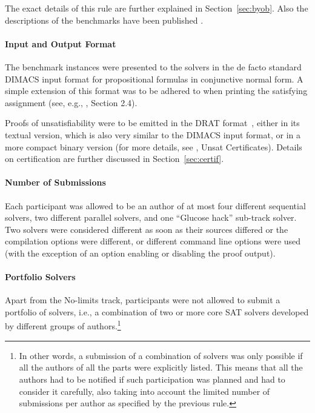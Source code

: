 \documentclass{elsarticle}
\begin{document}
The exact details of this rule are further explained in Section~\ref{sec:byob}.
Also the descriptions of the benchmarks have been published \cite{SC2020}.

\paragraph{Input and Output Format}

The benchmark instances were presented to the solvers in the de facto standard
DIMACS input format for propositional formulas in conjunctive normal form.
A simple extension of this format was to be adhered to when printing 
the satisfying assignment 
(see, e.g., \cite{DBLP:journals/jsat/HeuleJS19}, Section 2.4).

Proofs of unsatisfiability were to be emitted in the DRAT format~\cite{DRATtrim},
either in its textual version, which is also very similar to the DIMACS input format,
or in a more compact binary version (for more details, see \cite{satComp2020www}, Unsat Certificates).
%
Details on certification are further discussed in Section~\ref{sec:certif}.

\paragraph{Number of Submissions}

Each participant was allowed to be an author of at most four different sequential solvers,
two different parallel solvers, and one ``Glucose hack'' sub-track solver.
Two solvers were considered different as soon as their sources differed
or the compilation options were different, or different command line options were used
(with the exception of an option enabling or disabling the proof output).

\paragraph{Portfolio Solvers}

Apart from the No-limits track, participants were not allowed to submit a portfolio of solvers,
i.e., a combination of two or more core SAT solvers developed by different groups of authors.\footnote{
In other words, a submission of a combination of solvers was only possible if all the authors of all the parts
were explicitly listed. This means that all the authors had to be notified if such participation
was planned and had to consider it carefully, also taking into account the limited number of submissions per author
as specified by the previous rule.}
\end{document}
